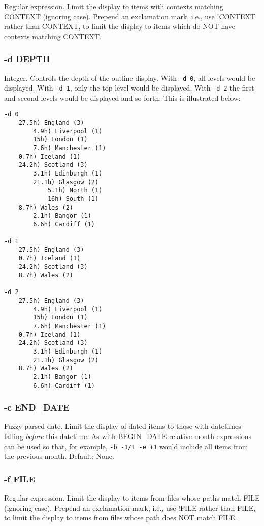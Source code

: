 \documentclass[]{article}
\begin{document}
Regular expression. Limit the display to items with contexts matching
CONTEXT (ignoring case). Prepend an exclamation mark, i.e., use !CONTEXT
rather than CONTEXT, to limit the display to items which do NOT have
contexts matching CONTEXT.

\subsubsection{-d DEPTH}

Integer. Controls the depth of the outline display. With \texttt{-d 0},
all levels would be displayed. With \texttt{-d 1}, only the top level
would be displayed. With \texttt{-d 2} the first and second levels would
be displayed and so forth. This is illustrated below:

\begin{verbatim}
-d 0
    27.5h) England (3)
        4.9h) Liverpool (1)
        15h) London (1)
        7.6h) Manchester (1)
    0.7h) Iceland (1)
    24.2h) Scotland (3)
        3.1h) Edinburgh (1)
        21.1h) Glasgow (2)
            5.1h) North (1)
            16h) South (1)
    8.7h) Wales (2)
        2.1h) Bangor (1)
        6.6h) Cardiff (1)

-d 1
    27.5h) England (3)
    0.7h) Iceland (1)
    24.2h) Scotland (3)
    8.7h) Wales (2)

-d 2
    27.5h) England (3)
        4.9h) Liverpool (1)
        15h) London (1)
        7.6h) Manchester (1)
    0.7h) Iceland (1)
    24.2h) Scotland (3)
        3.1h) Edinburgh (1)
        21.1h) Glasgow (2)
    8.7h) Wales (2)
        2.1h) Bangor (1)
        6.6h) Cardiff (1)
\end{verbatim}

\subsubsection{-e END\_DATE}

Fuzzy parsed date. Limit the display of dated items to those with
datetimes falling \emph{before} this datetime. As with BEGIN\_DATE
relative month expressions can be used so that, for example,
\texttt{-b -1/1  -e +1} would include all items from the previous month.
Default: None.

\subsubsection{-f FILE}

Regular expression. Limit the display to items from files whose paths
match FILE (ignoring case). Prepend an exclamation mark, i.e., use !FILE
rather than FILE, to limit the display to items from files whose path
does NOT match FILE.
\end{document}

